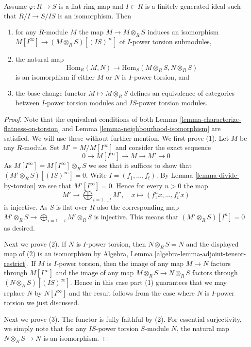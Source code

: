 \begin{lemma}
\label{lemma-neighbourhood-equivalence}
Assume $\varphi : R \to S$ is a flat ring map and $I \subset R$ is a
finitely generated ideal such that $R/I \to S/IS$ is an isomorphism. Then
\begin{enumerate}
\item for any $R$-module $M$ the map $M \to M \otimes_R S$ induces
an isomorphism
$M[I^\infty] \to (M \otimes_R S)[(IS)^\infty]$ of $I$-power
torsion submodules,
\item the natural map
$$
\text{Hom}_R(M, N) \longrightarrow \text{Hom}_S(M \otimes_R S, N \otimes_R S)
$$
is an isomorphism if either $M$ or $N$ is $I$-power torsion, and
\item the base change functor $M \mapsto M \otimes_R S$ defines an
equivalence of categories between $I$-power torsion modules
and $IS$-power torsion modules.
\end{enumerate}
\end{lemma}

\begin{proof}
Note that the equivalent conditions of both
Lemma \ref{lemma-characterize-flatness-on-torsion} and
Lemma \ref{lemma-neighbourhood-isomorphism}
are satisfied. We will use these without further mention.
We first prove (1). Let $M$ be any $R$-module.
Set $M' = M/M[I^\infty]$ and consider the exact sequence
$$
0 \to M[I^\infty] \to M \to M' \to 0
$$
As $M[I^\infty] = M[I^\infty] \otimes_R S$ we see that it suffices to
show that $(M' \otimes_R S)[(IS)^\infty] = 0$.
Write $I = (f_1, \ldots, f_t)$. By
Lemma \ref{lemma-divide-by-torsion}
we see that $M'[I^\infty] = 0$. Hence for every $n > 0$ the map
$$
M' \longrightarrow \bigoplus\nolimits_{i = 1, \ldots t} M',
\quad
x \longmapsto (f_1^n x, \ldots, f_t^n x)
$$
is injective. As $S$ is flat over $R$ also the corresponding map
$M' \otimes_R S \to \bigoplus_{i = 1, \ldots t} M' \otimes_R S$
is injective. This means that $(M' \otimes_R S)[I^n] = 0$ as desired.

\medskip\noindent
Next we prove (2). If $N$ is $I$-power torsion, then
$N \otimes_R S = N$ and the displayed map of (2) is an isomorphism by
Algebra, Lemma \ref{algebra-lemma-adjoint-tensor-restrict}.
If $M$ is $I$-power torsion, then the image of any map
$M \to N$ factors through $M[I^\infty]$ and the image of any map
$M \otimes_R S \to N \otimes_R S$ factors through
$(N \otimes_R S)[(IS)^\infty]$. Hence in this case
part (1) guarantees that we may replace $N$ by $N[I^\infty]$
and the result follows from the case where $N$ is $I$-power torsion
we just discussed.

\medskip\noindent
Next we prove (3). The functor is fully faithful by (2).
For essential surjectivity, we simply note that for any $IS$-power torsion
$S$-module $N$, the natural map $N \otimes_R S \to N$ is an isomorphism.
\end{proof}

